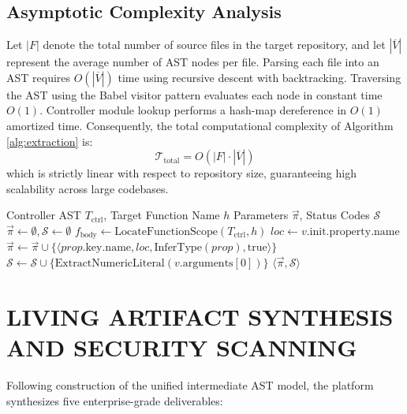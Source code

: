 \documentclass[a4paper,10pt]{article}
\begin{document}
\subsection{Asymptotic Complexity Analysis}
\noindent
Let $|F|$ denote the total number of source files in the target repository, and let $|\overline{V}|$ represent the average number of AST nodes per file. Parsing each file into an AST requires $O(|\overline{V}|)$ time using recursive descent with backtracking. Traversing the AST using the Babel visitor pattern evaluates each node in constant time $O(1)$. Controller module lookup performs a hash-map dereference in $O(1)$ amortized time. Consequently, the total computational complexity of Algorithm \ref{alg:extraction} is:
\begin{equation}
\mathcal{T}_{\text{total}} = O\left( |F| \cdot |\overline{V}| \right)
\end{equation}
which is strictly linear with respect to repository size, guaranteeing high scalability across large codebases.

\begin{algorithm}[t]
\caption{Controller Parameter Destructuring Inspection.}
\label{alg:controller}
\begin{algorithmic}[1]
\REQUIRE Controller AST $T_{\text{ctrl}}$, Target Function Name $h$
\ENSURE Parameters $\vec{\pi}$, Status Codes $\mathcal{S}$
\STATE $\vec{\pi} \leftarrow \emptyset, \mathcal{S} \leftarrow \emptyset$
\STATE $f_{\text{body}} \leftarrow \text{LocateFunctionScope}(T_{\text{ctrl}}, h)$
      \STATE $loc \leftarrow v.\text{init}.\text{property}.\text{name}$
        \STATE $\vec{\pi} \leftarrow \vec{\pi} \cup \{ \langle prop.\text{key}.\text{name}, loc, \text{InferType}(prop), \text{true} \rangle \}$
      \ENDFOR
    \ENDIF
    \STATE $\mathcal{S} \leftarrow \mathcal{S} \cup \{ \text{ExtractNumericLiteral}(v.\text{arguments}[0]) \}$
  \ENDIF
\ENDFOR
\RETURN $\langle \vec{\pi}, \mathcal{S} \rangle$
\end{algorithmic}
\end{algorithm}

\section{LIVING ARTIFACT SYNTHESIS AND SECURITY SCANNING}
\noindent
Following construction of the unified intermediate AST model, the platform synthesizes five enterprise-grade deliverables:
\end{document}
